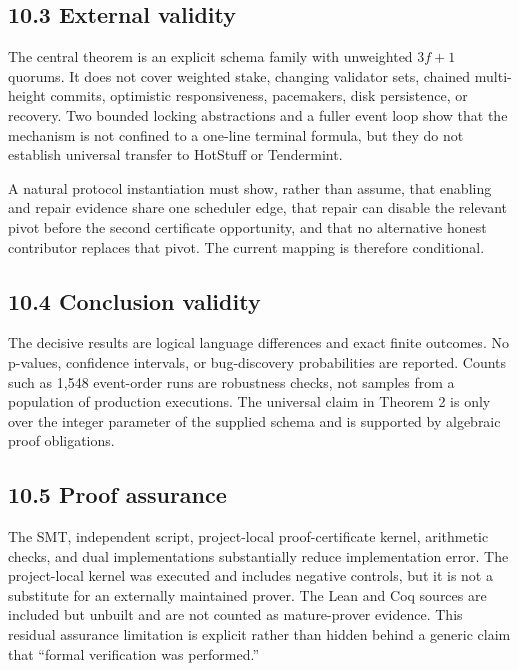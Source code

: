 \documentclass[10pt,a4paper]{article}
\begin{document}
\subsection{10.3 External validity}\label{external-validity}

The central theorem is an explicit schema family with unweighted
\(3f+1\) quorums. It does not cover weighted stake, changing validator
sets, chained multi-height commits, optimistic responsiveness,
pacemakers, disk persistence, or recovery. Two bounded locking
abstractions and a fuller event loop show that the mechanism is not
confined to a one-line terminal formula, but they do not establish
universal transfer to HotStuff or Tendermint.

A natural protocol instantiation must show, rather than assume, that
enabling and repair evidence share one scheduler edge, that repair can
disable the relevant pivot before the second certificate opportunity,
and that no alternative honest contributor replaces that pivot. The
current mapping is therefore conditional.

\subsection{10.4 Conclusion validity}\label{conclusion-validity}

The decisive results are logical language differences and exact finite
outcomes. No p-values, confidence intervals, or bug-discovery
probabilities are reported. Counts such as 1,548 event-order runs are
robustness checks, not samples from a population of production
executions. The universal claim in Theorem 2 is only over the integer
parameter of the supplied schema and is supported by algebraic proof
obligations.

\subsection{10.5 Proof assurance}\label{proof-assurance}

The SMT, independent script, project-local proof-certificate kernel,
arithmetic checks, and dual implementations substantially reduce
implementation error. The project-local kernel was executed and includes
negative controls, but it is not a substitute for an externally
maintained prover. The Lean and Coq sources are included but unbuilt and
are not counted as mature-prover evidence. This residual assurance
limitation is explicit rather than hidden behind a generic claim that
``formal verification was performed.''
\end{document}
